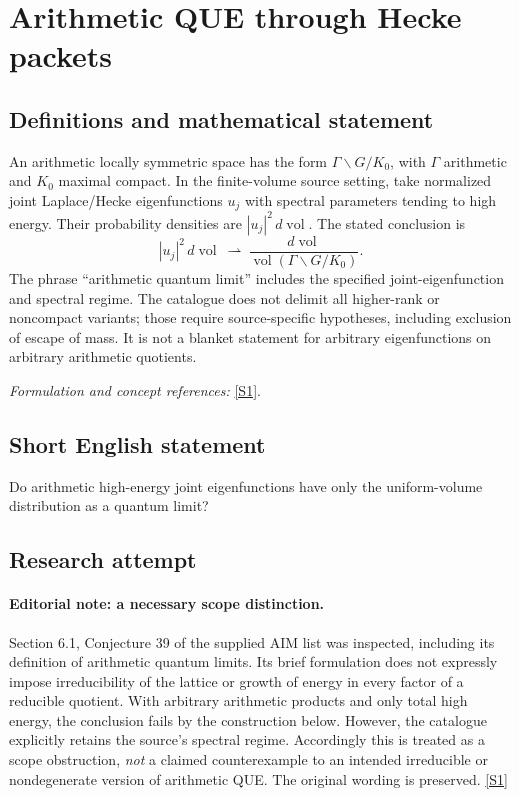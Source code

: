 \documentclass[11pt,a4paper]{article}
\newcommand{\sref}[2]{\hyperlink{source:#1:#2}{[S#2]}}
\newif\ifshowcatalogue
\newcommand{\cataloguescope}[1]{\ifshowcatalogue
 \paragraph{Exact scope in the supplied catalogue.}
 \begin{quote}\small #1\end{quote}\fi}
\numberwithin{equation}{section}
\begin{document}
\setcounter{section}{0}
\clearpage
\section*{\texorpdfstring{Arithmetic QUE through Hecke packets}{Arithmetic QUE through Hecke packets}}\label{20003326}
\subsection{Definitions and mathematical statement}
An arithmetic locally symmetric space has the form $\Gamma\backslash G/K_0$, with $\Gamma$ arithmetic and $K_0$ maximal compact. In the finite-volume source setting, take normalized joint Laplace/Hecke eigenfunctions $u_j$ with spectral parameters tending to high energy. Their probability densities are $|u_j|^2\,d\operatorname{vol}$. The stated conclusion is
\[
 |u_j|^2\,d\operatorname{vol}\ \rightharpoonup\
 \frac{d\operatorname{vol}}{\operatorname{vol}(\Gamma\backslash G/K_0)}.
\]
The phrase ``arithmetic quantum limit'' includes the specified joint-eigenfunction and spectral regime. The catalogue does not delimit all higher-rank or noncompact variants; those require source-specific hypotheses, including exclusion of escape of mass. It is not a blanket statement for arbitrary eigenfunctions on arbitrary arithmetic quotients.
\par\smallskip\textit{Formulation and concept references:} \sref{20003326}{1}.
\cataloguescope{Prove the arithmetic quantum unique ergodicity conjecture: for arithmetic locally symmetric spaces, the normalized Riemannian volume is the only arithmetic quantum limit of Hecke eigenfunctions.}
\subsection{Short English statement}
Do arithmetic high-energy joint eigenfunctions have only the uniform-volume distribution as a quantum limit?
\subsection{Research attempt}

\paragraph{Editorial note: a necessary scope distinction.}
Section 6.1, Conjecture 39 of the supplied AIM list was inspected, including
its definition of arithmetic quantum limits. Its brief formulation does
not expressly impose irreducibility of the lattice or growth of energy in
every factor of a reducible quotient. With arbitrary arithmetic products
and only total high energy, the conclusion fails by the construction below.
However, the catalogue explicitly retains the source's spectral regime.
Accordingly this is treated as a scope obstruction, \emph{not} a claimed
counterexample to an intended irreducible or nondegenerate version of
arithmetic QUE. The original wording is preserved. \sref{20003326}{1}
\end{document}
